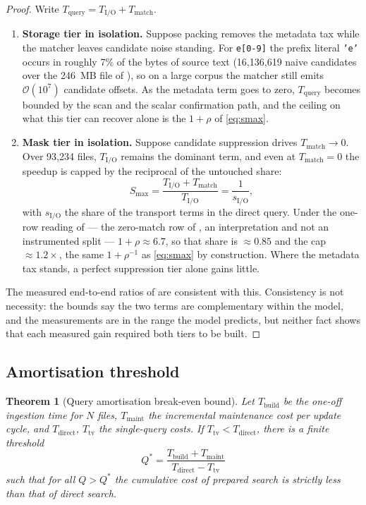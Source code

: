 \documentclass[11pt,letterpaper]{article}
\newtheorem{theorem}{Theorem}
\begin{document}
\begin{proof}
Write $T_{\text{query}}=T_{\text{I/O}}+T_{\text{match}}$.
\begin{enumerate}[leftmargin=*,itemsep=1pt,topsep=2pt]
\item \textbf{Storage tier in isolation.} Suppose packing removes the
  metadata tax while the matcher leaves candidate noise standing. For
  \texttt{e[0-9]} the prefix literal \texttt{'e'} occurs in roughly 7\% of
  the bytes of source text (16{,}136{,}619 naive candidates over the
  246~MB file of ), so on a large corpus the matcher still
  emits $\mathcal{O}(10^{7})$ candidate offsets. As the metadata term goes
  to zero, $T_{\text{query}}$ becomes bounded by the scan and the scalar
  confirmation path, and the ceiling on what this tier can recover alone is
  the $1+\rho$ of \eqref{eq:smax}.
\item \textbf{Mask tier in isolation.} Suppose candidate suppression drives
  $T_{\text{match}}\to 0$. Over 93{,}234 files, $T_{\text{I/O}}$ remains the
  dominant term, and even at $T_{\text{match}}=0$ the speedup is capped by
  the reciprocal of the untouched share:
  \begin{equation}
  S_{\max} = \frac{T_{\text{I/O}}+T_{\text{match}}}{T_{\text{I/O}}}
           = \frac{1}{s_{\text{I/O}}} ,
  \end{equation}
  with $s_{\text{I/O}}$ the share of the transport terms in the direct
  query. Under the one-row reading of  --- the
  zero-match row of , an interpretation and not an
  instrumented split --- $1+\rho\approx 6.7$, so that share is
  $\approx 0.85$ and the cap $\approx 1.2\times$, the same $1+\rho^{-1}$ as
  \eqref{eq:smax} by construction. Where the metadata tax stands, a perfect
  suppression tier alone gains little.
\end{enumerate}
The measured end-to-end ratios of  are consistent with this.
Consistency is not necessity: the bounds say the two terms are complementary
within the model, and the measurements are in the range the model predicts, but
neither fact shows that each measured gain required both tiers to be built.
\end{proof}

\subsection{Amortisation threshold}
\begin{theorem}[Query amortisation break-even bound]
\label{thm:breakeven}
Let $T_{\text{build}}$ be the one-off ingestion time for $N$ files,
$T_{\text{maint}}$ the incremental maintenance cost per update cycle, and
$T_{\text{direct}}$, $T_{\text{tv}}$ the single-query costs. If
$T_{\text{tv}}<T_{\text{direct}}$, there is a finite threshold
\begin{equation}
\label{eq:qstar}
Q^{*} = \frac{T_{\text{build}}+T_{\text{maint}}}
            {T_{\text{direct}}-T_{\text{tv}}}
\end{equation}
such that for all $Q>Q^{*}$ the cumulative cost of prepared search is
strictly less than that of direct search.
\end{theorem}
\end{document}
